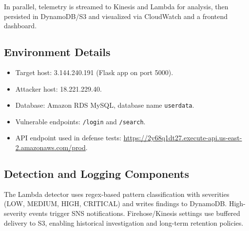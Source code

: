 \documentclass[12pt,a4paper]{article}
\begin{document}
In parallel, telemetry is streamed to Kinesis and Lambda for analysis, then persisted in DynamoDB/S3 and visualized via CloudWatch and a frontend dashboard.

\subsection{Environment Details}
\begin{itemize}
  \item Target host: 3.144.240.191 (Flask app on port 5000).
  \item Attacker host: 18.221.229.40.
  \item Database: Amazon RDS MySQL, database name \texttt{userdata}.
  \item Vulnerable endpoints: \texttt{/login} and \texttt{/search}.
  \item API endpoint used in defense tests: \url{https://2y68q1dt27.execute-api.us-east-2.amazonaws.com/prod}.
\end{itemize}

\subsection{Detection and Logging Components}
The Lambda detector uses regex-based pattern classification with severities (LOW, MEDIUM, HIGH, CRITICAL) and writes findings to DynamoDB. High-severity events trigger SNS notifications. Firehose/Kinesis settings use buffered delivery to S3, enabling historical investigation and long-term retention policies.
\end{document}
